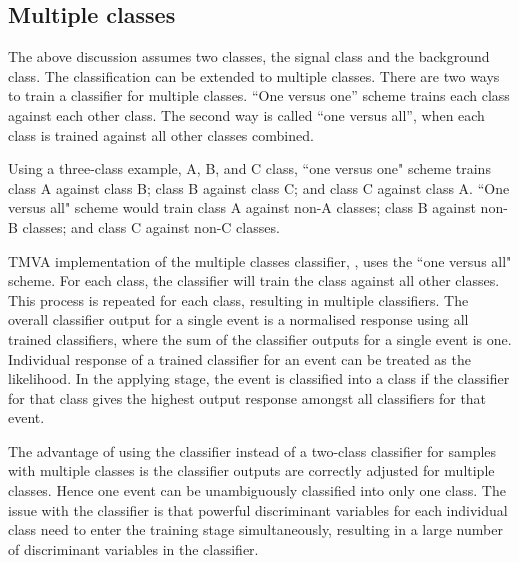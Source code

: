 \subsection{Multiple classes}
\label{sec:pandoraMVAmulticlass}

The above discussion  assumes two classes, the signal class and the background class. The classification can be extended to multiple classes. There are two ways to train a classifier for multiple classes. ``One versus one'' scheme trains each class against each other class. The second way is called ``one versus all'', when each class is trained against all other classes combined.

Using a three-class example, A, B, and C class, ``one versus one" scheme trains class A against class B;  class B against class C; and class C against class A.  ``One versus all" scheme would train class A against non-A classes; class B against non-B classes; and class C against non-C classes.


TMVA implementation of the multiple classes classifier, \multiclass, uses the ``one versus all" scheme. For each class, the \multiclass classifier will train the class against all other classes. This process is repeated for each class, resulting in multiple classifiers. The overall classifier output for a single event is a normalised response using all trained classifiers, where the sum of the classifier outputs for a single event is one. Individual response of a trained classifier for an event can be treated as the likelihood. In the applying stage, the event is classified into a class if the classifier for that class gives the highest output response amongst all classifiers for that event.

The advantage of using the \multiclass classifier instead of a two-class classifier for samples with multiple classes  is the classifier outputs are correctly adjusted for multiple classes. Hence one event can  be unambiguously classified into only one class. The issue with the \multiclass classifier is that powerful discriminant variables for each individual class need to enter the training stage simultaneously, resulting in a large number of discriminant variables in the  \multiclass classifier.


